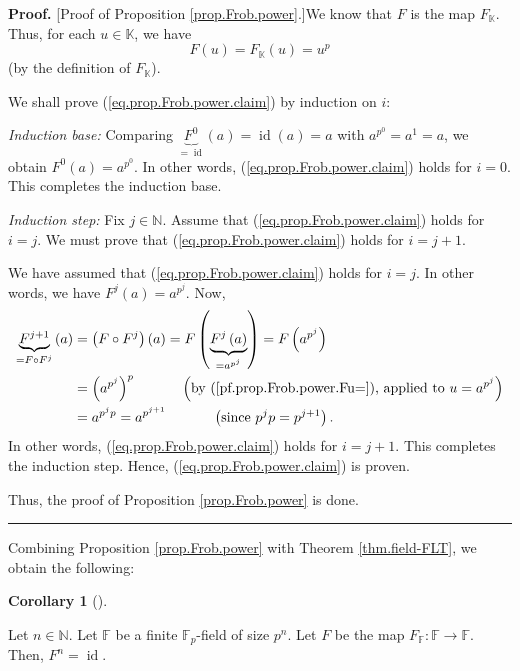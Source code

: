 \documentclass[numbers=enddot,12pt,final,onecolumn,notitlepage]{scrartcl}%
\theoremstyle{definition}
\newtheorem{coro}[theo]{Corollary}
\newenvironment{corollary}[1][]
{\begin{coro}[#1]\begin{leftbar}}
{\end{leftbar}\end{coro}}
\newenvironment{proof}[1][Proof]{\noindent\textbf{#1.} }{\ \rule{0.5em}{0.5em}}
\begin{document}
\begin{proof}
[Proof of Proposition \ref{prop.Frob.power}.]We know that $F$ is the map
$F_{\mathbb{K}}$. Thus, for each $u\in\mathbb{K}$, we have%
\begin{equation}
F\left(  u\right)  =F_{\mathbb{K}}\left(  u\right)  =u^{p}
\label{pf.prop.Frob.power.Fu=}%
\end{equation}
(by the definition of $F_{\mathbb{K}}$).

We shall prove (\ref{eq.prop.Frob.power.claim}) by induction on $i$:

\textit{Induction base:} Comparing $\underbrace{F^{0}}_{=\operatorname*{id}%
}\left(  a\right)  =\operatorname*{id}\left(  a\right)  =a$ with $a^{p^{0}%
}=a^{1}=a$, we obtain $F^{0}\left(  a\right)  =a^{p^{0}}$. In other words,
(\ref{eq.prop.Frob.power.claim}) holds for $i=0$. This completes the induction base.

\textit{Induction step:} Fix $j\in\mathbb{N}$. Assume that
(\ref{eq.prop.Frob.power.claim}) holds for $i=j$. We must prove that
(\ref{eq.prop.Frob.power.claim}) holds for $i=j+1$.

We have assumed that (\ref{eq.prop.Frob.power.claim}) holds for $i=j$. In
other words, we have $F^{j}\left(  a\right)  =a^{p^{j}}$. Now,%
\begin{align*}
\underbrace{F^{j+1}}_{=F\circ F^{j}}\left(  a\right)   &  =\left(  F\circ
F^{j}\right)  \left(  a\right)  =F\left(  \underbrace{F^{j}\left(  a\right)
}_{=a^{p^{j}}}\right)  =F\left(  a^{p^{j}}\right) \\
&  =\left(  a^{p^{j}}\right)  ^{p}\ \ \ \ \ \ \ \ \ \ \left(  \text{by
(\ref{pf.prop.Frob.power.Fu=}), applied to }u=a^{p^{j}}\right) \\
&  =a^{p^{j}p}=a^{p^{j+1}}\ \ \ \ \ \ \ \ \ \ \left(  \text{since }%
p^{j}p=p^{j+1}\right)  .
\end{align*}
In other words, (\ref{eq.prop.Frob.power.claim}) holds for $i=j+1$. This
completes the induction step. Hence, (\ref{eq.prop.Frob.power.claim}) is proven.

Thus, the proof of Proposition \ref{prop.Frob.power} is done.
\end{proof}

Combining Proposition \ref{prop.Frob.power} with Theorem \ref{thm.field-FLT},
we obtain the following:

\begin{corollary}
\label{cor.Frob.Fnid}Let $n\in\mathbb{N}$. Let $\mathbb{F}$ be a finite
$\mathbb{F}_{p}$-field of size $p^{n}$. Let $F$ be the map $F_{\mathbb{F}%
}:\mathbb{F}\rightarrow\mathbb{F}$. Then, $F^{n}=\operatorname*{id}$.
\end{corollary}
\end{document}
